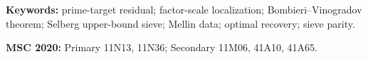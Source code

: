 \documentclass[11pt]{article}
\theoremstyle{definition}
\theoremstyle{remark}
\begin{document}
\noindent\textbf{Keywords:} prime-target residual; factor-scale
localization; Bombieri--Vinogradov theorem; Selberg upper-bound sieve;
Mellin data; optimal recovery; sieve parity.

\medskip
\noindent\textbf{MSC 2020:} Primary 11N13, 11N36; Secondary 11M06,
41A10, 41A65.











\end{document}
